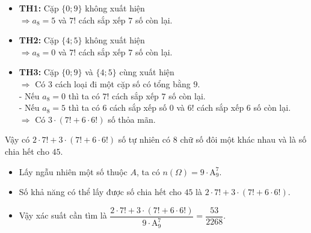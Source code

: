 \begin{vd}
{\begin{itemize}
			\item \textbf{TH1:} Cặp $\{0;9\}$ không xuất hiện\\
			$\Rightarrow a_8=5$ và $7!$ cách sắp xếp $7$ số còn lại.
			\item \textbf{TH2:} Cặp $\{4;5\}$ không xuất hiện\\
			$\Rightarrow a_8=0$ và $7!$ cách sắp xếp $7$ số còn lại.
			\item \textbf{TH3:} Cặp $\{0;9\}$ và $\{4;5\}$ cùng xuất hiện\\
			$\Rightarrow$ Có $3$ cách loại đi một cặp số có tổng bằng $9$.\\
			- Nếu $a_8=0$ thì ta có $7!$ cách sắp xếp $7$ số còn lại.\\
			- Nếu $a_8=5$ thì ta có $6$ cách sắp xếp số $0$ và $6!$ cách sắp xếp $6$ số còn lại.\\
			$\Rightarrow$ Có $3\cdot(7!+6\cdot6!)$ số thỏa mãn.
		\end{itemize}
		Vậy có $2\cdot 7! + 3\cdot(7!+6\cdot6!)$ số tự nhiên có $8$ chữ số đôi một khác nhau và là số chia hết cho $45$.
		\begin{itemize}
			\item Lấy ngẫu nhiên một số thuộc $A$, ta có $n(\Omega)=9\cdot\mathrm{A}_9^7$.
			\item Số khả năng có thể lấy được số chia hết cho $45$ là $2\cdot7!+3\cdot(7!+6\cdot6!)$.
			\item Vậy xác suất cần tìm là $\dfrac{2\cdot7!+3\cdot(7!+6\cdot6!)}{9\cdot\mathrm{A}_9^7}=\dfrac{53}{2268}$.
		\end{itemize}
	}
\end{vd}

